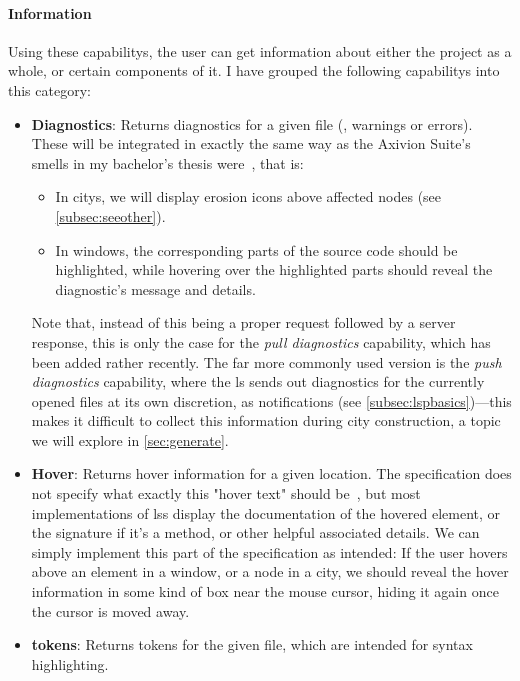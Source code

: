 \documentclass[../thesis]{subfiles}
\begin{document}
\paragraph{Information}
Using these \glspl{capability}, the user can get information about either the project as a whole, or certain components of it.
I have grouped the following \glspl{capability} into this category:
\begin{itemize}
	\item \textbf{Diagnostics}: Returns diagnostics for a given file (\eg, warnings or errors).
	      These will be integrated in exactly the same way as the Axivion Suite's \glspl{smell} in my bachelor's thesis were~\cite{galperin2021}, that is:
	      \begin{itemize}
		      \item In \glspl{city}, we will display erosion icons above affected nodes (see \cref{subsec:seeother}).
		      \item In \glspl{window}, the corresponding parts of the source code should be highlighted, while hovering over the highlighted parts should reveal the diagnostic's message and details.
	      \end{itemize}
	      Note that, instead of this being a proper request followed by a server response, this is only the case for the \emph{pull diagnostics} \gls{capability}, which has been added rather recently.
	      The far more commonly used version is the \emph{push diagnostics} \gls{capability}, where the \gls{ls} sends out diagnostics for the currently opened files at its own discretion, as notifications (see \cref{subsec:lspbasics})---this makes it difficult to collect this information during city construction, a topic we will explore in \cref{sec:generate}.
	\item \textbf{Hover}: Returns hover information for a given location.
	      The specification does not specify what exactly this "hover text" should be~\cite{lsp}, but most implementations of \glspl{ls} display the documentation of the hovered element, or the signature if it's a method, or other helpful associated details.
	      We can simply implement this part of the specification as intended:
	      If the user hovers above an element in a \gls{window}, or a node in a \gls{city}, we should reveal the hover information in some kind of box near the mouse cursor, hiding it again once the cursor is moved away.
      \item \textbf{\Glspl*{token}}: Returns \glspl*{token} for the given file, which are intended for syntax highlighting.

\end{itemize}
\end{document}

